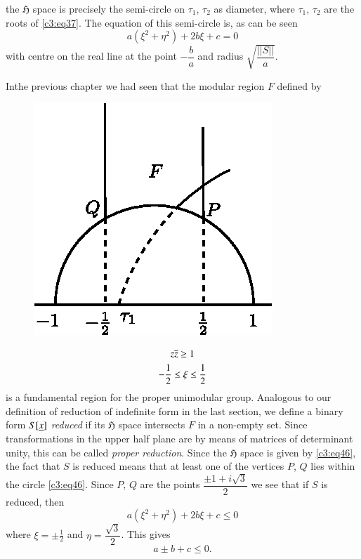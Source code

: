 the $\mathfrak{H}$ space is precisely the semi-circle on $\tau_{1}$,
$\tau_{2}$ as diameter, where $\tau_{1}$, $\tau_{2}$ are the roots of
\eqref{c3:eq37}. The equation of this semi-circle is, as can be seen
\begin{equation*}
a(\xi^{2}+\eta^{2})+2b\xi+c=0\tag{46}\label{c3:eq46}
\end{equation*}
with centre on the real line at the point $-\dfrac{b}{a}$ and radius
$\sqrt{\dfrac{||S||}{a}}$. 

In\pageoriginale the previous chapter we had seen that the modular
region $F$ defined by
\begin{figure}[H]
\centering
\includegraphics{fig4.eps}
\end{figure}

\begin{gather*}
z\overline{z}\geq 1\\
- \frac{1}{2}\leq \xi\leq \frac{1}{2}
\end{gather*}
is a fundamental region for the proper unimodular group. Analogous to
our definition of reduction of indefinite form in the last section, we
define a binary form $S[\underline{x}]$ {\em reduced} if its $\mathfrak{H}$
space intersects $F$ in a non-empty set. Since transformations in the
upper half plane are by means of matrices of determinant unity, this
can be called {\em proper reduction}. Since the $\mathfrak{H}$ space
is given by \eqref{c3:eq46}, the fact that $S$ is reduced means that at
least one of the vertices $P$, $Q$ lies within the circle
\eqref{c3:eq46}. Since $P$, $Q$ are the points $\dfrac{\pm 1+i\sqrt{3}}{2}$
we see that if $S$ is reduced, then
$$
a\left(\xi^{2}+\eta^{2}\right)+2b\xi+c\leq 0
$$
where $\xi=\pm \frac{1}{2}$ and $\eta=\dfrac{\sqrt{3}}{2}$. This gives
\begin{equation*}
a\pm b+c\leq 0.\tag{47}\label{c3:eq47}
\end{equation*}

